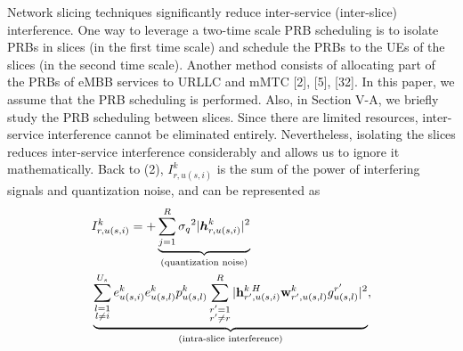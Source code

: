 \documentclass[12pt, letterpaper]{article}
\begin{document}
Network slicing techniques significantly reduce inter-service (inter-slice) interference.
One way to leverage a two-time scale PRB scheduling is to isolate PRBs in slices (in the first time scale) and schedule the PRBs to the UEs of the slices (in the second time scale). Another method consists of allocating part of the PRBs of eMBB services to URLLC and mMTC [2], [5], [32]. In this paper, we assume that the PRB scheduling is performed. Also, in Section V-A, we briefly study the PRB scheduling between slices.
Since there are limited resources, inter-service interference cannot be eliminated entirely. Nevertheless, isolating the slices reduces inter-service interference considerably and allows us to ignore it mathematically.
Back to (2), $I_{r,u(s,i)}^{k}$ is the sum of the power of interfering signals and quantization noise, and can be represented as 
\begin{align}\label{eqI}
&I_{r,u(s,i)}^{k} =+\underbrace{  \sum_{j=1}^{{R}} {\sigma_q}^2 |\boldsymbol{h}_{r,{u(s,i)}}^k|^2 }_{\text{(quantization noise)}}\nonumber\\
 &\underbrace{\sum_{\substack{l=1 \\ l\neq i}}^{{U}_{s}} e^{k}_{u(s,i)}e^{k}_{u(s,l)}  p_{u(s,l)}^{k}\sum_{\substack{r'=1 \\ r'\neq r}}^{R}|{\bold{h}_{r',u(s,i)}^{k \: H}} \bold{w}_{r',u(s,l)}^{k} g_{u(s,l)}^{r'}|^2}_{\text{(intra-slice interference)}},
\end{align}
\end{document}
